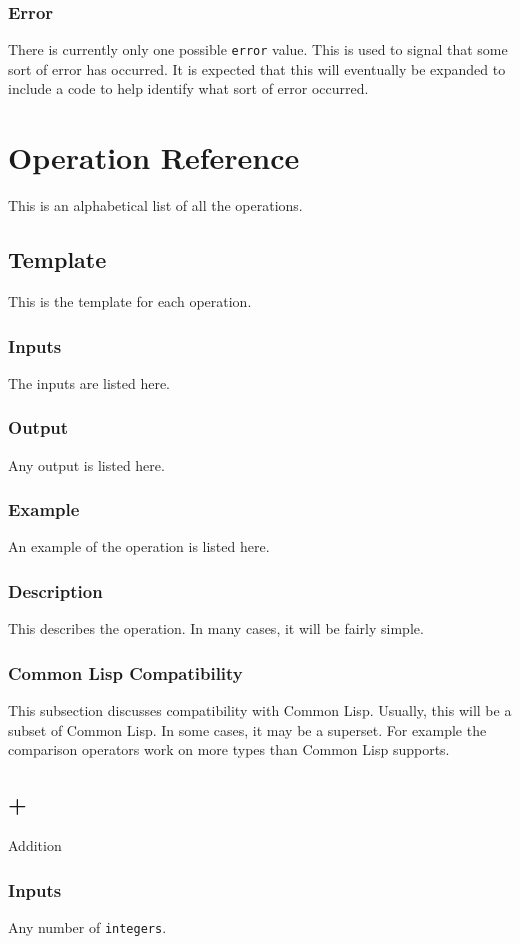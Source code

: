 \documentclass[10pt, openany]{book}
\newcommand{\datatype}[1]{\texttt{#1}}
\newcommand{\cl}{Common Lisp}
\begin{document}
\subsection{Error}
There is currently only one possible \datatype{error} value.  This is used to signal that some sort of error has occurred.  It is expected that this will eventually be expanded to include a code to help identify what sort of error occurred.

\chapter{Operation Reference}
This is an alphabetical list of all the operations.
\section{Template}
This is the template for each operation.
\subsection{Inputs}
The inputs are listed here.
\subsection{Output}
Any output is listed here.
\subsection{Example}
An example of the operation is listed here.
\subsection{Description}
This describes the operation.  In many cases, it will be fairly simple.
\subsection{Common Lisp Compatibility}
This subsection discusses compatibility with \cl.  Usually, this will be a subset of \cl.  In some cases, it may be a superset.  For example the comparison operators work on more types than \cl{} supports.

\section{+}
Addition
\subsection{Inputs}
Any number of \datatype{integers}.
\end{document}
